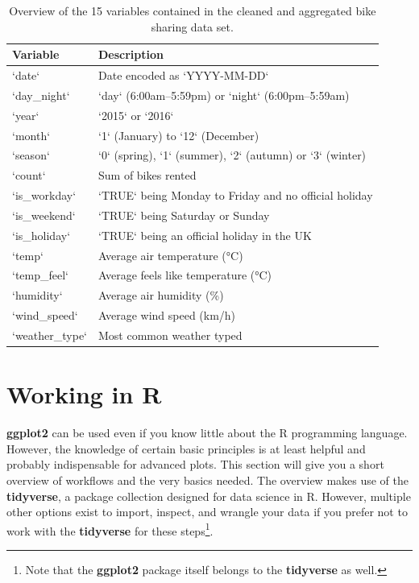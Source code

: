 \documentclass[
]{krantz}
\begin{document}
\begin{longtable}[t]{ll}
\caption{\label{tab:03tableBikesData}Overview of the 15 variables contained in the cleaned and aggregated bike sharing data set.}\\
\toprule
Variable & Description\\
\midrule
`date` & Date encoded as `YYYY-MM-DD`\\
`day\_night` & `day` (6:00am–5:59pm) or `night` (6:00pm–5:59am)\\
`year` & `2015` or `2016`\\
`month` & `1` (January) to `12` (December)\\
`season` & `0` (spring), `1` (summer), `2` (autumn) or `3` (winter)\\
\addlinespace
`count` & Sum of bikes rented\\
`is\_workday` & `TRUE` being Monday to Friday and no official holiday\\
`is\_weekend` & `TRUE` being Saturday or Sunday\\
`is\_holiday` & `TRUE` being an official holiday in the UK\\
`temp` & Average air temperature (°C)\\
\addlinespace
`temp\_feel` & Average feels like temperature (°C)\\
`humidity` & Average air humidity (\%)\\
`wind\_speed` & Average wind speed (km/h)\\
`weather\_type` & Most common weather typed\\
\bottomrule
\end{longtable}

\hypertarget{rstats}{%
\section{Working in R}\label{rstats}}

\textbf{ggplot2} can be used even if you know little about the R programming language. However, the knowledge of certain basic principles is at least helpful and probably indispensable for advanced plots. This section will give you a short overview of workflows and the very basics needed. The overview makes use of the \textbf{tidyverse}, a package collection designed for data science in R. However, multiple other options exist to import, inspect, and wrangle your data if you prefer not to work with the \textbf{tidyverse} for these steps\footnote{Note that the \textbf{ggplot2} package itself belongs to the \textbf{tidyverse} as well.}.
\end{document}
